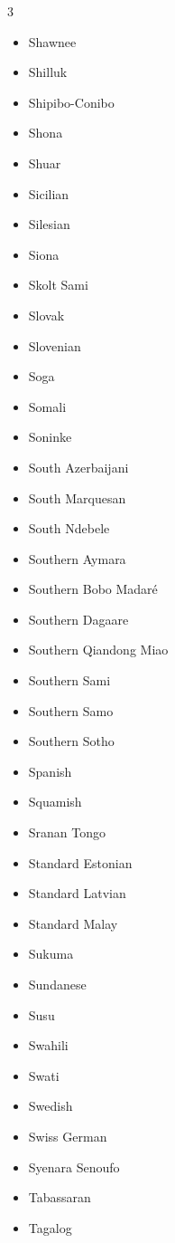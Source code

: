 \documentclass[paper=a4, 10pt]{scrbook}
\begin{document}
\begin{multicols}{3}
\begin{itemize}
        \item Shawnee
        \item Shilluk
        \item Shipibo-Conibo
        \item Shona
        \item Shuar
        \item Sicilian
        \item Silesian
        \item Siona
        \item Skolt Sami
        \item Slovak
        \item Slovenian
        \item Soga
        \item Somali
        \item Soninke
        \item South Azerbaijani
        \item South Marquesan
        \item South Ndebele
        \item Southern Aymara
        \item Southern Bobo Madaré
        \item Southern Dagaare
        \item Southern Qiandong Miao
        \item Southern Sami
        \item Southern Samo
        \item Southern Sotho
        \item Spanish
        \item Squamish
        \item Sranan Tongo
        \item Standard Estonian
        \item Standard Latvian
        \item Standard Malay
        \item Sukuma
        \item Sundanese
        \item Susu
        \item Swahili
        \item Swati
        \item Swedish
        \item Swiss German
        \item Syenara Senoufo
        \item Tabassaran
        \item Tagalog

\end{itemize}
\end{multicols}
\end{document}
